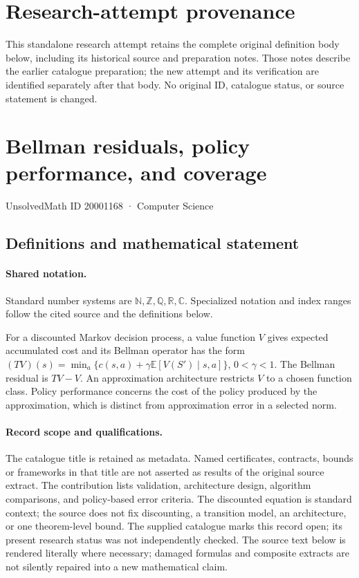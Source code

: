 \documentclass[11pt]{article}
\begin{document}
\section*{Research-attempt provenance}
This standalone research attempt retains the complete original definition body below,
including its historical source and preparation notes. Those notes describe the
earlier catalogue preparation; the new attempt and its verification are identified
separately after that body. No original ID, catalogue status, or source statement is changed.

\section{Bellman residuals, policy performance, and coverage}\label{20001168}
{\small UnsolvedMath ID 20001168 · Computer Science}
\subsection{Definitions and mathematical statement}

\paragraph{Shared notation.}Standard number systems are $\mathbb N,\mathbb Z,\mathbb Q,\mathbb R,\mathbb C$. Specialized notation and index ranges follow the cited source and the definitions below.


For a discounted Markov decision process, a value function $V$ gives expected accumulated cost and its Bellman operator has the form $(TV)(s)=\min_a\{c(s,a)+\gamma\mathbb E[V(S')\mid s,a]\}$, $0<\gamma<1$. The Bellman residual is $TV-V$. An approximation architecture restricts $V$ to a chosen function class. Policy performance concerns the cost of the policy produced by the approximation, which is distinct from approximation error in a selected norm.
\paragraph{Record scope and qualifications.}
The catalogue title is retained as metadata. Named certificates, contracts, bounds or frameworks in that title are not asserted as results of the original source extract.
The contribution lists validation, architecture design, algorithm comparisons, and policy-based error criteria. The discounted equation is standard context; the source does not fix discounting, a transition model, an architecture, or one theorem-level bound. The supplied catalogue marks this record open; its present research status was not independently checked.
The source text below is rendered literally where necessary; damaged formulas and composite extracts are not silently repaired into a new mathematical claim.
\end{document}
